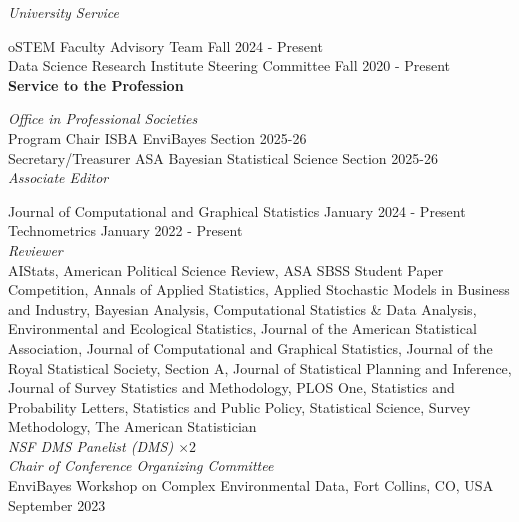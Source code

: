 \documentclass[margin,line]{res}
\begin{document}
\begin{resume}
\vspace{-.3cm}
{\em University Service}

\vspace{-.3cm}
oSTEM Faculty Advisory Team \hfill {Fall 2024 - Present} \\ 
Data Science Research Institute Steering Committee \hfill {Fall 2020 - Present} \\


{\bf Service to the Profession}

\vspace{-.3cm}
{\em Office in Professional Societies} \\
Program Chair ISBA EnviBayes Section \hfill {2025-26} \\
Secretary/Treasurer ASA Bayesian Statistical Science Section \hfill {2025-26} \\

\vspace{-.3cm}
{\em Associate Editor}

\vspace{-.3cm}
Journal of Computational and Graphical Statistics \hfill {January 2024 - Present} \\
Technometrics \hfill {January 2022 - Present} \\

{\em Reviewer} \\
AIStats, American Political Science Review, ASA SBSS Student Paper Competition, Annals of Applied Statistics, Applied Stochastic Models in Business and Industry, Bayesian Analysis, Computational Statistics \& Data Analysis, Environmental and Ecological Statistics, Journal of the American Statistical Association, Journal of Computational and Graphical Statistics, Journal of the Royal Statistical Society, Section A, Journal of Statistical Planning and Inference, Journal of Survey Statistics and Methodology, PLOS One, Statistics and Probability Letters, Statistics and Public Policy, Statistical Science, Survey Methodology, The American Statistician \\

\vspace{-.3cm}
{\em NSF DMS Panelist (DMS) $\times 2$} \\

\vspace{-.3cm}
{\em Chair of Conference Organizing Committee} \\
EnviBayes Workshop on Complex Environmental Data, Fort Collins, CO, USA \hfill {September 2023} \\


\end{resume}
\end{document}
